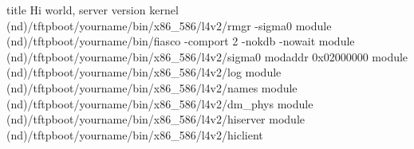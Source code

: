 title Hi world, server version
  kernel (nd)/tftpboot/yourname/bin/x86_586/l4v2/rmgr -sigma0
  module (nd)/tftpboot/yourname/bin/fiasco -comport 2 -nokdb -nowait
  module (nd)/tftpboot/yourname/bin/x86_586/l4v2/sigma0
  modaddr 0x02000000
  module (nd)/tftpboot/yourname/bin/x86_586/l4v2/log
  module (nd)/tftpboot/yourname/bin/x86_586/l4v2/names
  module (nd)/tftpboot/yourname/bin/x86_586/l4v2/dm_phys
  module (nd)/tftpboot/yourname/bin/x86_586/l4v2/hiserver 
  module (nd)/tftpboot/yourname/bin/x86_586/l4v2/hiclient

